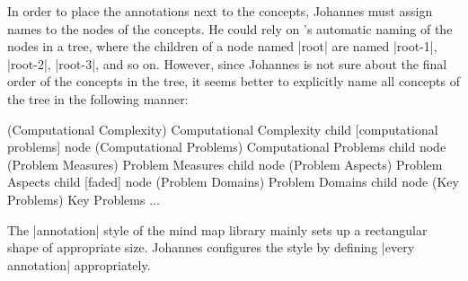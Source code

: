 In order to place the annotations next to the concepts, Johannes must
assign names to the nodes of the concepts. He could rely on
\tikzname's automatic naming of the nodes in a tree, where the
children of a node named |root| are named |root-1|, |root-2|,
|root-3|, and so on. However, since Johannes is not sure about the
final order of the concepts in the tree, it seems better to explicitly
name all concepts of the tree in the following manner:

\begin{codeexample}
 (Computational Complexity) {Computational Complexity}
  child [computational problems] { node (Computational Problems) {Computational Problems}
    child         { node (Problem Measures) {Problem Measures} }
    child         { node (Problem Aspects) {Problem Aspects} }
    child [faded] { node (Problem Domains) {Problem Domains} }
    child         { node (Key Problems) {Key Problems} }
  }
...
\end{codeexample}

The |annotation| style of the mind map library mainly sets up a
rectangular shape of appropriate size. Johannes configures the style
by defining |every annotation| appropriately.

